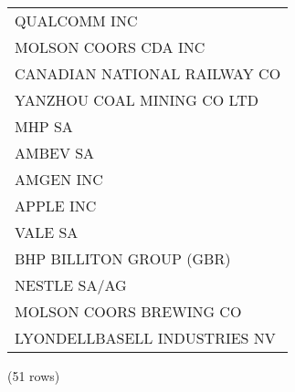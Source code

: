 \begin{tabular}{l}
QUALCOMM INC \\
MOLSON COORS CDA INC \\
CANADIAN NATIONAL RAILWAY CO \\
YANZHOU COAL MINING CO LTD \\
MHP SA \\
AMBEV SA \\
AMGEN INC \\
APPLE INC \\
VALE SA \\
BHP BILLITON GROUP (GBR) \\
NESTLE SA/AG \\
MOLSON COORS BREWING CO \\
LYONDELLBASELL INDUSTRIES NV \\
\end{tabular}

\noindent (51 rows) \\

